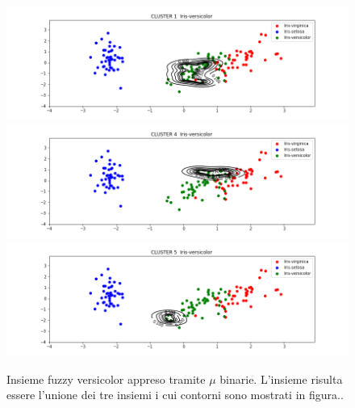 \documentclass [11pt,a4paper,twoside,openright] {book}
\begin{document}
\begin{figure}[!bt]
        \centering%
        \subfigure%
          {\includegraphics[scale=.3, angle=90]{figure/blvers1.png}}\qquad\qquad
       \subfigure%
          {\includegraphics[scale=.3, angle=90]{figure/blvers2.png}}\qquad\qquad
           \subfigure%
          {\includegraphics[scale=.3, angle= 90]{figure/blvers3.png}}
          \caption{Insieme fuzzy versicolor appreso tramite $\mu$ binarie. L'insieme risulta essere l'unione dei tre insiemi i cui contorni sono mostrati in figura.\label{blvers}.}
\end{figure}
\end{document}
